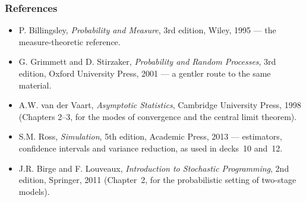 \documentclass[aspectratio=169]{beamer}
\begin{document}
\begin{frame}
\frametitle{References}

\begin{itemize}
\item
P. Billingsley, \emph{Probability and Measure}, 3rd edition, Wiley, 1995 --- the measure-theoretic reference.
\item
G. Grimmett and D. Stirzaker, \emph{Probability and Random Processes}, 3rd edition, Oxford University Press, 2001 --- a gentler route to the same material.
\item
A.W. van der Vaart, \emph{Asymptotic Statistics}, Cambridge University Press, 1998 (Chapters 2--3, for the modes of convergence and the central limit theorem).
\item
S.M. Ross, \emph{Simulation}, 5th edition, Academic Press, 2013 --- estimators, confidence intervals and variance reduction, as used in decks~10 and~12.
\item
J.R. Birge and F. Louveaux, \emph{Introduction to Stochastic Programming}, 2nd edition, Springer, 2011 (Chapter~2, for the probabilistic setting of two-stage models).
\end{itemize}

\end{frame}
\end{document}
